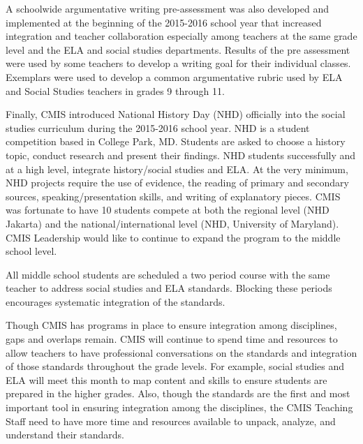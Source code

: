 \documentclass{report}
\begin{document}
\begin{findings}
A schoolwide argumentative writing pre-assessment was also developed and implemented at the beginning of the 2015-2016 school year that increased integration and teacher collaboration especially among teachers at the same grade level and the ELA  and social studies departments. Results of the pre assessment were used by some teachers to develop a writing goal for their individual classes. Exemplars were used to develop a common argumentative rubric used by ELA and Social Studies teachers in grades 9 through 11. 


Finally, CMIS introduced National History Day (NHD) officially into the social studies curriculum during the 2015-2016 school year. NHD is a student competition based in College Park, MD. Students are asked to choose a history topic, conduct research and present their findings. NHD students successfully and at a high level, integrate history/social studies and ELA. At the very minimum, NHD projects require the use of evidence, the reading of primary and secondary sources, speaking/presentation skills, and writing of explanatory pieces. CMIS was fortunate to have  10 students compete at both the regional level (NHD Jakarta) and the national/international level (NHD, University of Maryland). CMIS Leadership would like to continue to expand the program to the middle school level. 


All middle school students are scheduled a two period course with the same teacher to address social studies and ELA standards. Blocking these periods encourages systematic integration of the standards. 


Though CMIS has programs in place to ensure integration among disciplines, gaps and overlaps remain. CMIS will continue to spend time and resources to allow teachers to have professional conversations on the standards and integration of those standards throughout the grade levels. For example, social studies and ELA will meet this month to map content and skills to ensure students are prepared in the higher grades. Also, though the standards are the first and most important tool in ensuring integration among the disciplines, the CMIS Teaching Staff need to have more time and resources available to unpack, analyze, and understand their standards. 
\end{findings}
\end{document}
